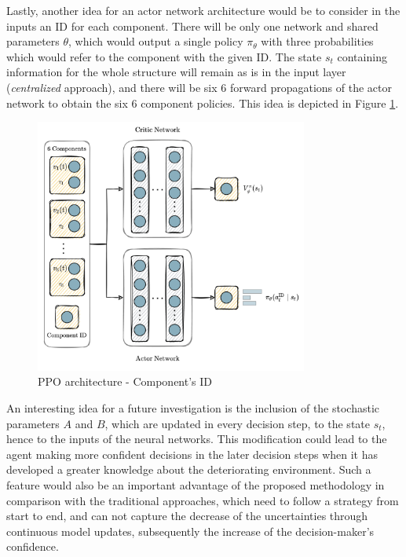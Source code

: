 \newpage

Lastly, another idea for an actor network architecture would be to consider in the inputs an ID for each component. There will be only one network and shared parameters $\theta$, which would output a single policy $\pi_{\theta}$ with three probabilities which would refer to the component with the given ID. The state $s_t$ containing information for the whole structure will remain as is in the input layer (\textit{centralized} approach), and there will be six 6 forward propagations of the actor network to obtain the six 6 component policies. This idea is depicted in Figure \ref{casePPOnetID}.

\begin{figure}[H]
    \centering
    \includegraphics[width=0.8\textwidth]{Figures/neuralNetID.png}
	\caption{\gls{PPO} architecture - Component's ID}
	\label{casePPOnetID}
\end{figure}

\newpage

An interesting idea for a future investigation is the inclusion of the stochastic parameters $A$ and $B$, which are updated in every decision step, to the state $s_t$, hence to the inputs of the neural networks. This modification could lead to the agent making more confident decisions in the later decision steps when it has developed a greater knowledge about the deteriorating environment. Such a feature would also be an important advantage of the proposed methodology in comparison with the traditional approaches, which need to follow a strategy from start to end, and can not capture the decrease of the uncertainties through continuous model updates, subsequently the increase of the decision-maker's confidence.\\

